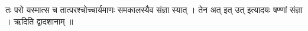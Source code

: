 तः परो यस्मात्स च तात्परश्चोच्चार्यमाणः समकालस्यैव संज्ञा स्यात् । तेन
अत् इत् उत् इत्यादयः षण्णां संज्ञा । ऋदिति द्वादशानाम् ॥
